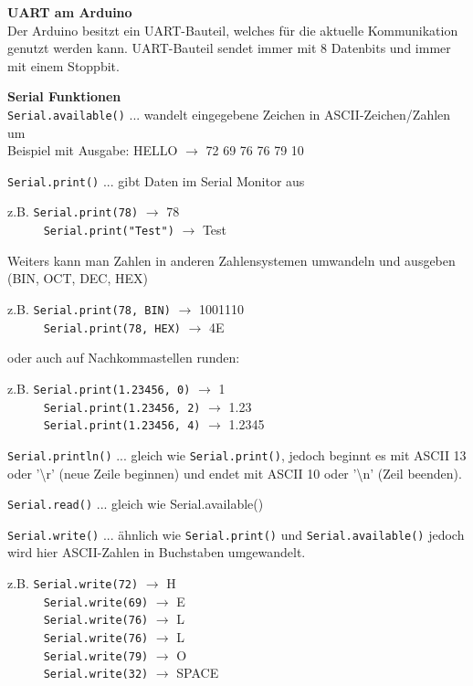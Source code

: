 \textbf{UART am Arduino} \\
Der Arduino besitzt ein UART-Bauteil, welches für die aktuelle Kommunikation genutzt werden kann. UART-Bauteil sendet immer mit 8 Datenbits und immer mit einem Stoppbit.


\textbf{Serial Funktionen} \\
\texttt{Serial.available()} ... wandelt eingegebene Zeichen in ASCII-Zeichen/Zahlen um \\
Beispiel mit Ausgabe: HELLO $\rightarrow$ 72 69 76 76 79 10

\texttt{Serial.print()} ... gibt Daten im Serial Monitor aus
\begin{tabbing}
	z.B. \= \texttt{Serial.print(78)} $\rightarrow$ 78 \\
	~~~~~ \= \texttt{Serial.print("Test")} $\rightarrow$ Test 
\end{tabbing}
Weiters kann man Zahlen in anderen Zahlensystemen umwandeln und ausgeben (BIN, OCT, DEC, HEX) 
\begin{tabbing}
	z.B. \= \texttt{Serial.print(78, BIN)} $\rightarrow$ 1001110 \\
	~~~~~ \= \texttt{Serial.print(78, HEX)} $\rightarrow$ 4E 
\end{tabbing}
oder auch auf Nachkommastellen runden:
\begin{tabbing}
	z.B. \= \texttt{Serial.print(1.23456, 0)} $\rightarrow$ 1 \\
	~~~~~ \= \texttt{Serial.print(1.23456, 2)} $\rightarrow$ 1.23 \\
	~~~~~ \= \texttt{Serial.print(1.23456, 4)} $\rightarrow$ 1.2345
\end{tabbing}

\texttt{Serial.println()} ... gleich wie \texttt{Serial.print()}, jedoch beginnt es mit ASCII 13 oder '\textbackslash r' (neue Zeile beginnen) und endet mit ASCII 10 oder '\textbackslash n' (Zeil beenden).

\texttt{Serial.read()} ... gleich wie Serial.available()

\texttt{Serial.write()} ... ähnlich wie \texttt{Serial.print()} und \texttt{Serial.available()} jedoch wird hier ASCII-Zahlen in Buchstaben umgewandelt.
\begin{tabbing}
	z.B. \= \texttt{Serial.write(72)} $\rightarrow$ H \\
	~~~~~ \= \texttt{Serial.write(69)} $\rightarrow$ E \\
	~~~~~ \= \texttt{Serial.write(76)} $\rightarrow$ L \\
	~~~~~ \= \texttt{Serial.write(76)} $\rightarrow$ L \\
	~~~~~ \= \texttt{Serial.write(79)} $\rightarrow$ O \\
	~~~~~ \= \texttt{Serial.write(32)} $\rightarrow$ SPACE \\
\end{tabbing}


